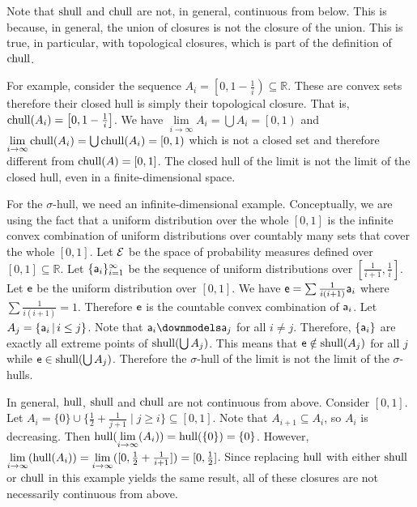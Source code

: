 \begin{mathSection}
\begin{remark}
	Note that $\shull$ and $\chull$ are not, in general, continuous from below. This is because, in general, the union of closures is not the closure of the union. This is true, in particular, with topological closures, which is part of the definition of $\chull$.
	
	For example, consider the sequence $A_i = \left[0, 1-\frac{1}{i}\right) \subseteq \mathbb{R}$. These are convex sets therefore their closed hull is simply their topological closure. That is, $\chull(A_i) = \left[0, 1-\frac{1}{i}\right]$. We have $\lim\limits_{i \to \infty} A_i = \bigcup A_i = \left[0, 1\right)$ and $\lim\limits_{i \to \infty} \chull(A_i) = \bigcup \chull(A_i) = \left[0, 1\right)$ which is not a closed set and therefore different from $\chull(A) = [0,1]$. The closed hull of the limit is not the limit of the closed hull, even in a finite-dimensional space.
	
	For the $\sigma$-hull, we need an infinite-dimensional example. Conceptually, we are using the fact that a uniform distribution over the whole $[0,1]$ is the infinite convex combination of uniform distributions over countably many sets that cover the whole $[0,1]$. Let $\Ens$ be the space of probability measures defined over $[0,1] \subseteq \mathbb{R}$. Let $\{\ens[a]_i\}_{i=1}^{\infty}$ be the sequence of uniform distributions over $\left[\frac{1}{i+1}, \frac{1}{i}\right]$. Let $\ens$ be the uniform distribution over $[0,1]$. We have $\ens = \sum \frac{1}{i(i+1)} \ens[a]_i$ where $\sum \frac{1}{i(i+1)} = 1$. Therefore $\ens$ is the countable convex combination of $\ens[a]_i$. Let $A_j = \{ \ens[a]_i \, | \, i \leq j\}$. Note that $\ens[a]_i \separate \ens[a]_j$ for all $i \neq j$. Therefore, $\{\ens[a]_i\}$ are exactly all extreme points of $\shull(\bigcup A_j)$. This means that $\ens \notin \shull(A_j)$ for all $j$ while $\ens \in \shull(\bigcup A_j)$. Therefore the $\sigma$-hull of the limit is not the limit of the $\sigma$-hulls.
\end{remark}

\begin{remark}
	In general, $\hull$, $\shull$ and $\chull$ are not continuous from above. Consider $[0,1]$. Let $A_i = \{0\} \cup \{\frac{1}{2} + \frac{1}{j+1} \mid j \ge i\} \subseteq [0,1]$. Note that $A_{i+1} \subseteq A_i$, so $A_i$ is decreasing. Then $\hull(\lim\limits_{i \to \infty}(A_i)) = \hull(\{0\}) = \{0\}$. However, $\lim\limits_{i \to \infty}(\hull(A_i)) = \lim\limits_{i \to \infty}([0,\frac{1}{2} + \frac{1}{i+1}]) = [0,\frac{1}{2}]$. Since replacing $\hull$ with either $\shull$ or $\chull$ in this example yields the same result, all of these closures are not necessarily continuous from above.
\end{remark}


\end{mathSection}
